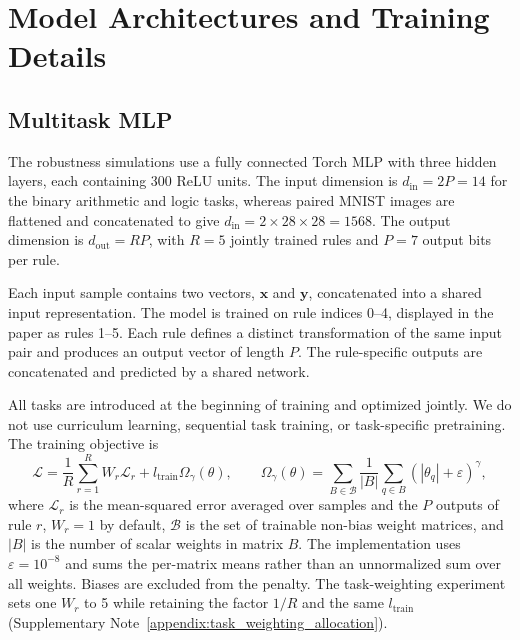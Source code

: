 \documentclass{article}
\begin{document}
\section{Model Architectures and Training Details}
\label{appendix:architecture}

\subsection{Multitask MLP}

The robustness simulations use a fully connected Torch MLP with three hidden layers, each containing 300 ReLU units. The input dimension is $d_{\mathrm{in}}=2P=14$ for the binary arithmetic and logic tasks, whereas paired MNIST images are flattened and concatenated to give $d_{\mathrm{in}}=2\times28\times28=1568$. The output dimension is $d_{\mathrm{out}}=RP$, with $R=5$ jointly trained rules and $P=7$ output bits per rule.

Each input sample contains two vectors, $\mathbf{x}$ and $\mathbf{y}$, concatenated into a shared input representation. The model is trained on rule indices 0--4, displayed in the paper as rules 1--5. Each rule defines a distinct transformation of the same input pair and produces an output vector of length $P$. The rule-specific outputs are concatenated and predicted by a shared network.

All tasks are introduced at the beginning of training and optimized jointly. We do not use curriculum learning, sequential task training, or task-specific pretraining. The training objective is
\[
\mathcal{L}=\frac{1}{R}\sum_{r=1}^{R}W_r\mathcal{L}_{r}+l_{\mathrm{train}}\Omega_\gamma(\theta),\qquad
\Omega_\gamma(\theta)=\sum_{B\in\mathcal{B}}\frac{1}{|B|}\sum_{q\in B}(|\theta_q|+\varepsilon)^\gamma,
\]
where $\mathcal{L}_{r}$ is the mean-squared error averaged over samples and the $P$ outputs of rule $r$, $W_r=1$ by default, $\mathcal{B}$ is the set of trainable non-bias weight matrices, and $|B|$ is the number of scalar weights in matrix $B$. The implementation uses $\varepsilon=10^{-8}$ and sums the per-matrix means rather than an unnormalized sum over all weights. Biases are excluded from the penalty. The task-weighting experiment sets one $W_r$ to 5 while retaining the factor $1/R$ and the same $l_{\mathrm{train}}$ (Supplementary Note~\ref{appendix:task_weighting_allocation}).
\end{document}
